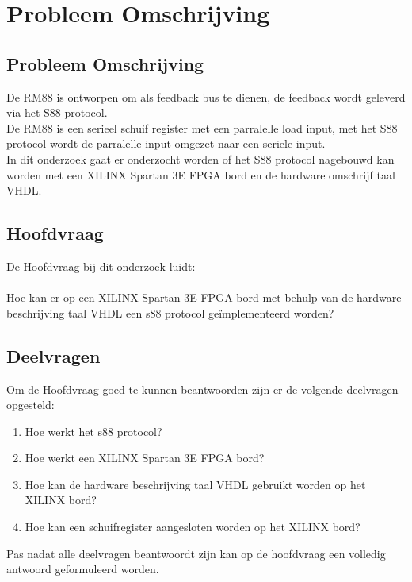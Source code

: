 \chapter{Probleem Omschrijving}
\section{Probleem Omschrijving}

De RM88 is ontworpen om als feedback bus te dienen, de feedback wordt geleverd via het S88 protocol.\\
De RM88 is een serieel schuif register met een parralelle load input, met het S88 protocol wordt de parralelle input omgezet naar een seriele input.\\
In dit onderzoek gaat er onderzocht worden of het S88 protocol nagebouwd kan worden met een XILINX Spartan 3E FPGA bord en de hardware omschrijf taal VHDL.


\section{Hoofdvraag}
De Hoofdvraag bij dit onderzoek luidt:
\\\\
Hoe kan er op een XILINX Spartan 3E FPGA bord met behulp van de hardware beschrijving taal VHDL een s88 protocol geïmplementeerd worden?
\\

\section{Deelvragen}
Om de Hoofdvraag goed te kunnen beantwoorden zijn er de volgende deelvragen opgesteld:

\begin{enumerate}
	\item Hoe werkt het s88 protocol?
	\item Hoe werkt een XILINX Spartan 3E FPGA bord?
	\item Hoe kan de hardware beschrijving taal VHDL gebruikt worden op het XILINX bord?
	\item Hoe kan een schuifregister aangesloten worden op het XILINX bord?
\end{enumerate}

Pas nadat alle deelvragen beantwoordt zijn kan op de hoofdvraag een volledig antwoord geformuleerd worden.